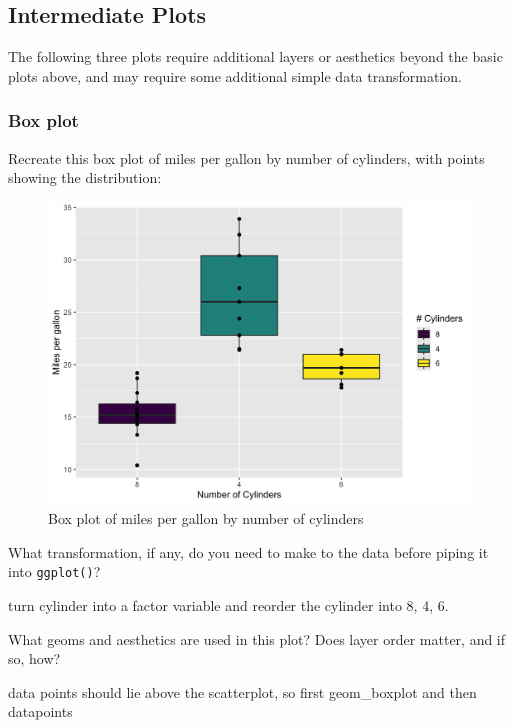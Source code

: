 \documentclass[
  man,
  floatsintext,
  longtable,
  nolmodern,
  notxfonts,
  notimes,
  colorlinks=true,linkcolor=blue,citecolor=blue,urlcolor=blue]{apa7}
\begin{document}
\subsection{Intermediate Plots}\label{intermediate-plots}

The following three plots require additional layers or aesthetics beyond
the basic plots above, and may require some additional simple data
transformation.

\subsubsection{Box plot}\label{box-plot}

Recreate this box plot of miles per gallon by number of cylinders, with
points showing the distribution:

\begin{figure}[H]

\caption{Box plot of miles per gallon by number of cylinders}

{\centering \includegraphics{plots/plot4.png}

}

\end{figure}%

What transformation, if any, do you need to make to the data before
piping it into \texttt{ggplot()}?

turn cylinder into a factor variable and reorder the cylinder into 8, 4,
6.

What geoms and aesthetics are used in this plot? Does layer order
matter, and if so, how?

data points should lie above the scatterplot, so first geom\_boxplot and
then datapoints
\end{document}
